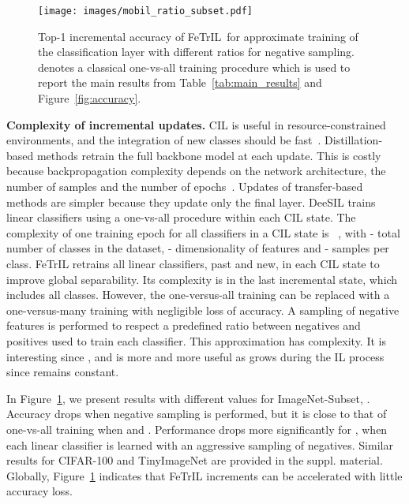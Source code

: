 \documentclass[10pt,twocolumn,letterpaper]{article}
\makeatletter
\newcommand{\ourmodel}{FeTrIL\@\xspace}
\newcommand{\ourmodelone}{FeTrIL~}
\makeatother
\begin{document}
\begin{figure}
\centering
{\texttt{[image: images/mobil\_ratio\_subset.pdf]} }
\vspace{-1mm}
\caption{Top-1 incremental accuracy of \ourmodelone for approximate training of the classification layer with different ratios for negative sampling.  denotes a classical one-vs-all training procedure which is used to report the main results from Table~\ref{tab:main_results} and Figure~\ref{fig:accuracy}. 
}
\vspace{-5mm}
\label{fig:ratios}
\end{figure}

\textbf{Complexity of incremental updates.}
CIL is useful in resource-constrained environments, and the integration of new classes should be fast~\cite{hayes2022online,ravaglia2021tinyml}.
Distillation-based methods retrain the full backbone model at each update.
This is costly because backpropagation complexity depends on the network architecture, the number of samples and the number of epochs~\cite{goodfellow2016deep}.
Updates of transfer-based methods are simpler because they update only the final layer.
DeeSIL trains linear classifiers using a one-vs-all procedure within each CIL state.
The complexity of one training epoch for all classifiers in a CIL state is ~\cite{bottou2007tradeoffs}, with  - total number of classes in the dataset,  - dimensionality of features and  - samples per class.
\ourmodel retrains all linear classifiers, past and new, in each CIL state to improve global separability. 
Its complexity is  in the last incremental state, which includes all classes.
However, the one-versus-all training can be replaced with a one-versus-many training with negligible loss of accuracy.
A sampling of negative features is performed to respect a predefined ratio  between negatives and positives used to train each classifier.
This approximation has  complexity. 
It is interesting since , and is more and more useful as  grows during the IL process since  remains constant.

In Figure~\ref{fig:ratios}, we present results with different  values for ImageNet-Subset, . 
Accuracy drops when negative sampling is performed, but it is close to that of one-vs-all training when  and .
Performance drops more significantly for , when each linear classifier is learned with an aggressive sampling of negatives.
Similar results for CIFAR-100 and TinyImageNet are provided in the suppl. material.
Globally, Figure~\ref{fig:ratios} indicates that \ourmodel increments can be accelerated with little accuracy loss. 
\end{document}
